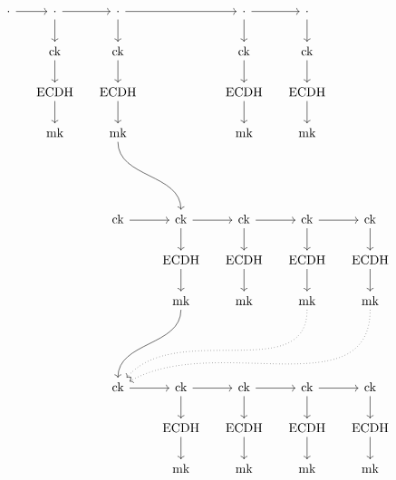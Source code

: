 \documentclass[letterpaper]{article}
\begin{document}



\def\ck{\textrm{ck}}
\def\DH{\textrm{DH}}
\def\mk{\textrm{mk}}
\def\ECDH{\textrm{ECDH}}

\[\begin{tikzcd}[ampersand replacement=\&, column sep=small]
\cdot \ar[r] \& \cdot \ar[r] \ar[d] \& \cdot \ar[rr] \ar[d] \& \& \cdot \ar[r] \ar[d] \& \cdot \ar[d] \&  \& \& \\
 \& \ck \ar[d] \& \ck \ar[d] \& \& \ck \ar[d] \& \ck \ar[d] \&  \& \& \\
 \& \ECDH \ar[d] \& \ECDH \ar[d] \& \& \ECDH \ar[d] \& \ECDH\ar[d] \&  \& \& \\
 \& \mk \& \mk \ar[dddr, in=90, out=270] \& \& \mk \& \mk \&  \& \& \\
\\
\\
 \& \& \ck \ar[r] \& \ck \ar[r] \ar[d] \& \ck \ar[r] \ar[d] \& \ck \ar[r] \ar[d] \& \ck \ar[d] \&  \& \& \\
 \& \& \& \ECDH \ar[d] \& \ECDH \ar[d] \& \ECDH \ar[d] \& \ECDH\ar[d] \&  \& \& \\
 \& \& \& \mk \ar[dddl, in=90, out=270] \& \mk \& \mk \ar[dddlll, dotted, in=50, out=270] \& \mk \ar[dddllll, dotted, in=30, out=270] \&  \& \& \\
\\
\\
 \& \& \ck \ar[r] \& \ck \ar[r] \ar[d] \& \ck \ar[r] \ar[d] \& \ck \ar[r] \ar[d] \& \ck \ar[d] \&  \& \& \\
 \& \& \& \ECDH \ar[d] \& \ECDH \ar[d] \& \ECDH \ar[d] \& \ECDH\ar[d] \&  \& \& \\
 \& \& \& \mk \& \mk \& \mk \& \mk \&  \& \& \\
\end{tikzcd}\]


\end{document}
